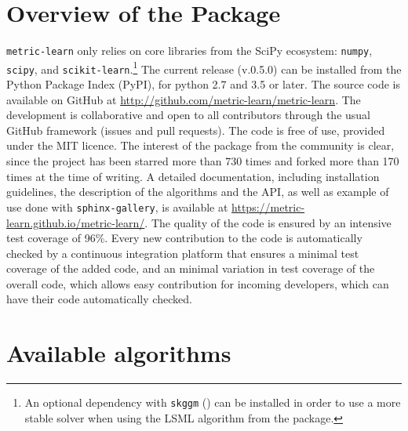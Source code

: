 \documentclass[twoside,11pt]{article}
\begin{document}
\section{Overview of the Package}

\texttt{metric-learn} only relies on core libraries from the SciPy ecosystem: \texttt{numpy}, \texttt{scipy}, and \texttt{scikit-learn}.\footnote{An optional dependency with \texttt{skggm} (\cite{skggm}) can be installed in order to use a more stable solver when using the LSML algorithm from the package.}
The current release (v.0.5.0) can be installed from the Python Package Index (PyPI), for python 2.7 and 3.5 or later. The source code is available on GitHub at \url{http://github.com/metric-learn/metric-learn}. The development is collaborative and open to all contributors through the usual GitHub framework (issues and pull requests). The code is free of use, provided under the MIT licence. The interest of the package from the community is clear, since the project has been starred more than 730 times and forked more than 170 times at the time of writing.
A detailed documentation, including installation guidelines, the description of the algorithms and the API, as well as example of use done with \texttt{sphinx-gallery}, is available at \url{https://metric-learn.github.io/metric-learn/}. The quality of the code is ensured by an intensive test coverage of 96\%. Every new contribution to the code is automatically checked by a continuous integration platform that ensures a minimal test coverage of the added code, and an minimal variation in test coverage of the overall code, which allows easy contribution for incoming developers, which can have their code automatically checked.

\section{Available algorithms}

\end{document}
